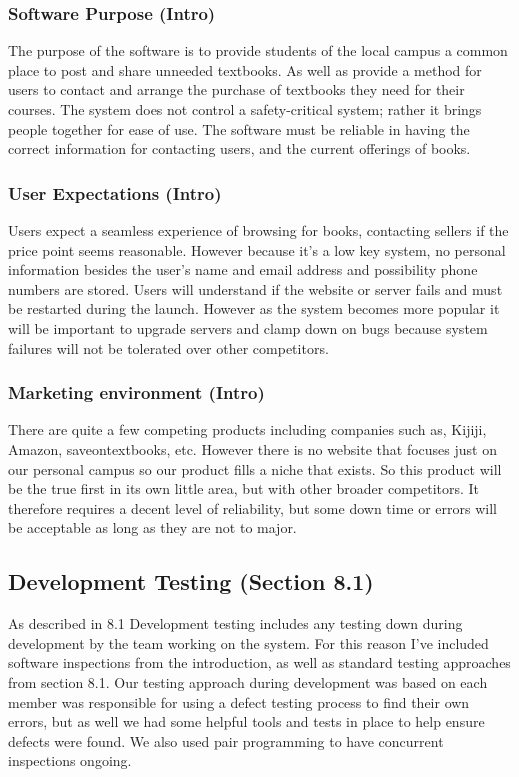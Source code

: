 \documentclass[11pt]{article}
\begin{document}
		\subsubsection{Software Purpose (Intro)}
			The purpose of the software is to provide students of the local campus a common place to post and share unneeded textbooks.
			As well as provide a method for users to contact and arrange the purchase of textbooks they need for their courses. 
			The system does not control a safety-critical system; rather it brings people together for ease of use. 
			The software must be reliable in having the correct information for contacting users, and the current offerings of books.
		\subsubsection{User Expectations (Intro)}
			Users expect a seamless experience of browsing for books, contacting sellers if the price point seems reasonable.
			However because it's a low key system, no personal information besides the user's name and email address and possibility phone numbers are stored.
			Users will understand if the website or server fails and must be restarted during the launch.
			However as the system becomes more popular it will be important to upgrade servers and clamp down on bugs because system failures will not be tolerated over other competitors.

		\subsubsection{Marketing environment (Intro)}
			There are quite a few competing products including companies such as, Kijiji, Amazon, saveontextbooks, etc.
			However there is no website that focuses just on our personal campus so our product fills a niche that exists.
			So this product will be the true first in its own little area, but with other broader competitors.
			It therefore requires a decent level of reliability, but some down time or errors will be acceptable as long as they are not to major.

	\subsection{Development Testing (Section 8.1)}
		As described in 8.1 Development testing includes any testing down during development by the team working on the system. 
		For this reason I've included software inspections from the introduction, as well as standard testing approaches from section 8.1.
		Our testing approach during development was based on each member was responsible for using a defect testing process to find their own errors, but as well we had some helpful tools and tests in place to help ensure defects were found. 
		We also used pair programming to have concurrent inspections ongoing.
\end{document}
